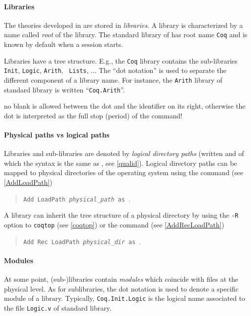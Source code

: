 {\begin{coq_example}
\paragraph{Libraries}

The theories developed in {\Coq} are stored in {\em libraries}.  A
library is characterized by a name called {\it root} of the
library. The standard library of {\Coq} has root name {\tt Coq} and is
known by default when a {\Coq} session starts.

Libraries have a tree structure. E.g., the {\tt Coq} library
contains the sub-libraries {\tt Init}, {\tt Logic}, {\tt Arith}, {\tt
Lists}, ... The ``dot notation'' is used to separate the different
component of a library name. For instance, the {\tt Arith} library of
{\Coq} standard library is written ``{\tt Coq.Arith}''.

\medskip
\Rem no blank is allowed between the dot and the identifier on its
right, otherwise the dot is interpreted as the full stop (period) of
the command!
\medskip

\paragraph{Physical paths vs logical paths}

Libraries and sub-libraries are denoted by {\em logical directory
paths} (written {\dirpath} and of which the syntax is the same as
{\qualid}, see \ref{qualid}). Logical directory
paths can be mapped to physical directories of the
operating system using the command (see \ref{AddLoadPath})

\begin{quote}
{\tt Add LoadPath {\it physical\_path} as {\dirpath}}.
\end{quote}

A library can inherit the tree structure of a physical directory by
using the {\tt -R} option to {\tt coqtop} (see \ref{coqtop}) or the
command (see \ref{AddRecLoadPath})

\begin{quote}
{\tt Add Rec LoadPath {\it physical\_dir} as {\dirpath}}.
\end{quote}

\paragraph{Modules}
At some point, (sub-)libraries contain {\it modules} which coincide
with files at the physical level. 
As for sublibraries, the dot notation is used to denote a specific
module of a library. Typically, {\tt Coq.Init.Logic} is the logical name
associated to the file {\tt Logic.v} of {\Coq} standard library.


\end{coq_example}}
